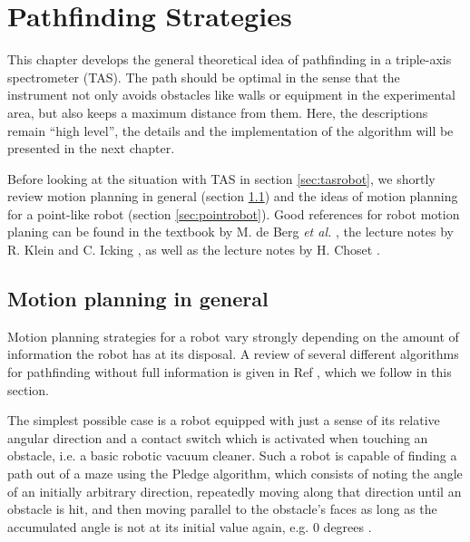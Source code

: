 %
%

\chapter{Pathfinding Strategies}
\label{ch:paths}

This chapter develops the general theoretical idea of pathfinding in a
triple-axis spectrometer (TAS).
The path should be optimal in the sense that the instrument not only avoids 
obstacles like walls or equipment in the experimental area, but also keeps a 
maximum distance from them. 
Here, the descriptions remain ``high level'', the details and the implementation 
of the algorithm will be presented in the next chapter.

Before looking at the situation with TAS in section \ref{sec:tasrobot}, we shortly 
review motion planning in general (section \ref{sec:motionplanning}) and the ideas of
motion planning for a point-like robot (section \ref{sec:pointrobot}).
Good references for robot motion planing can be found in the textbook by 
M. de Berg \textit{et al.} \cite[Ch. 13, pp. 283-306]{Berg2008}, the lecture notes by
R. Klein and C. Icking \cite[Ch. 7, pp. 313-366]{FUH_geo2020}, as well as the lecture 
notes by H. Choset \cite{Choset2010}.


\section{Motion planning in general}
\label{sec:motionplanning}
Motion planning strategies for a robot vary strongly depending on the amount of
information the robot has at its disposal. A review of several different algorithms
for pathfinding without full information is given in Ref \cite[Ch. 7, pp. 313-366]{FUH_geo2020},
which we follow in this section.

The simplest possible case is a robot equipped with just a sense of its relative
angular direction and a contact switch which is activated when touching an obstacle,
i.e. a basic robotic vacuum cleaner.
Such a robot is capable of finding a path out of a maze using the Pledge algorithm,
which consists of noting the angle of an initially arbitrary direction, repeatedly
moving along that direction until an obstacle is hit, and then moving parallel to the
obstacle's faces as long as the accumulated angle is not at its initial value again,
e.g. $0$ degrees \cite[Ch. 7.2, pp. 316-322]{FUH_geo2020}.

